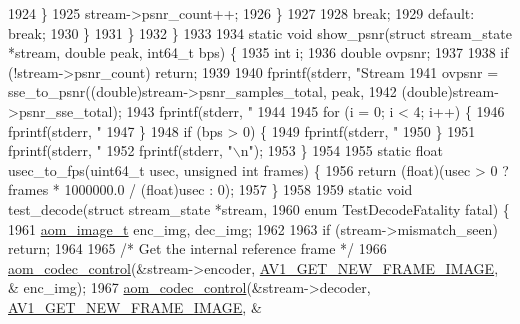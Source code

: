 \begin{DoxyCodeInclude}
{{{{{{{{{{{{{{{{{{{{{{{{{{{{{{{{{{{{{{{1924           \}
1925           stream->psnr\_count++;
1926         \}
1927 
1928         \textcolor{keywordflow}{break};
1929       \textcolor{keywordflow}{default}: \textcolor{keywordflow}{break};
1930     \}
1931   \}
1932 \}
1933 
1934 \textcolor{keyword}{static} \textcolor{keywordtype}{void} show\_psnr(\textcolor{keyword}{struct} stream\_state *stream, \textcolor{keywordtype}{double} peak, int64\_t bps) \{
1935   \textcolor{keywordtype}{int} i;
1936   \textcolor{keywordtype}{double} ovpsnr;
1937 
1938   \textcolor{keywordflow}{if} (!stream->psnr\_count) \textcolor{keywordflow}{return};
1939 
1940   fprintf(stderr, \textcolor{stringliteral}{"Stream %
1941   ovpsnr = sse\_to\_psnr((\textcolor{keywordtype}{double})stream->psnr\_samples\_total, peak,
1942                        (\textcolor{keywordtype}{double})stream->psnr\_sse\_total);
1943   fprintf(stderr, \textcolor{stringliteral}{" %
1944 
1945   \textcolor{keywordflow}{for} (i = 0; i < 4; i++) \{
1946     fprintf(stderr, \textcolor{stringliteral}{" %
1947   \}
1948   \textcolor{keywordflow}{if} (bps > 0) \{
1949     fprintf(stderr, \textcolor{stringliteral}{" %
1950   \}
1951   fprintf(stderr, \textcolor{stringliteral}{" %
1952   fprintf(stderr, \textcolor{stringliteral}{"\(\backslash\)n"});
1953 \}
1954 
1955 \textcolor{keyword}{static} \textcolor{keywordtype}{float} usec\_to\_fps(uint64\_t usec, \textcolor{keywordtype}{unsigned} \textcolor{keywordtype}{int} frames) \{
1956   \textcolor{keywordflow}{return} (\textcolor{keywordtype}{float})(usec > 0 ? frames * 1000000.0 / (float)usec : 0);
1957 \}
1958 
1959 \textcolor{keyword}{static} \textcolor{keywordtype}{void} test\_decode(\textcolor{keyword}{struct} stream\_state *stream,
1960                         \textcolor{keyword}{enum} TestDecodeFatality fatal) \{
1961   \hyperlink{structaom__image}{aom\_image\_t} enc\_img, dec\_img;
1962 
1963   \textcolor{keywordflow}{if} (stream->mismatch\_seen) \textcolor{keywordflow}{return};
1964 
1965   \textcolor{comment}{/* Get the internal reference frame */}
1966   \hyperlink{group__codec_ga6da974f4eeaba1fa74106b28d0fe6ac5}{aom\_codec\_control}(&stream->encoder, \hyperlink{group__aom_gga9421a1fa78c0d9587ae5aa6c1cb3d659a410c706a34f5295996658cc5044a700f}{AV1\_GET\_NEW\_FRAME\_IMAGE}, &
      enc\_img);
1967   \hyperlink{group__codec_ga6da974f4eeaba1fa74106b28d0fe6ac5}{aom\_codec\_control}(&stream->decoder, \hyperlink{group__aom_gga9421a1fa78c0d9587ae5aa6c1cb3d659a410c706a34f5295996658cc5044a700f}{AV1\_GET\_NEW\_FRAME\_IMAGE}, &
}}}}}}}}}}}}}}}}}}}}}}}}}}}}}}}}}}}}}}}}}}}}
\end{DoxyCodeInclude}
